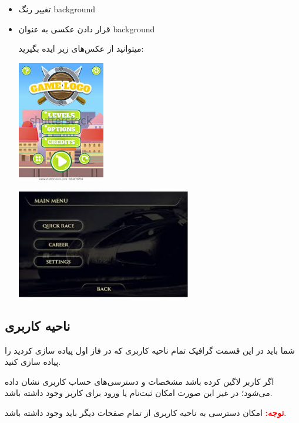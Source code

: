 \documentclass[]{article}
\begin{document}
\begin{itemize}
\item
تغییر رنگ background

\item
قرار دادن عکسی به عنوان background

میتوانید از عکس‌های زیر ایده بگیرید:

\begin{center}
\includegraphics[width=0.3\textwidth]{images/image6.png}
\end{center}

\begin{center}
\includegraphics[width=0.6\textwidth]{images/image7.png}
\end{center}
\end{itemize}

\newpage

\subsection*{{\titr ناحیه کاربری}}

 شما باید در این قسمت گرافیک تمام ناحیه کاربری که در فاز اول پیاده سازی کردید را پیاده سازی کنید.
 
اگر کاربر لاگین کرده باشد مشخصات و دسترسی‌های حساب کاربری نشان داده می‌شود؛ در غیر این صورت  امکان ثبت‌نام یا ورود برای کاربر وجود داشته باشد.

\textbf{\textcolor{red}{توجه:}}
 امکان دسترسی به ناحیه کاربری از تمام صفحات دیگر باید وجود داشته باشد.
\end{document}
